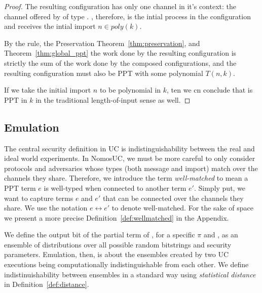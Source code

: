 \begin{proof}
The resulting configuration  has only one channel in it's context: the channel offered by  of type . 
, therefore, is the intial process in the configuration and receives the intial import $n \in poly(k)$.

By the  rule, the Preservation Theorem~\ref{thm:preservation}, and Theorem~\ref{thm:global_ppt} the work done by the resulting configuration is strictly the sum of the work done by the composed configurations, and the resulting configuration  must also be PPT with some polynomial $T(n,k)$.

If we take the initial import $n$ to be polynomial in $k$, ten we cn conclude that  is PPT in $k$ in the traditional length-of-input sense as well.

\end{proof}


\subsection{Emulation}
The central security definition in UC is indistinguishability between the real and ideal world experiments.
In NomosUC, we must be more careful to only consider protocols and adversaries whose types (both message and import) match over the channels they share. 
Therefore, we introduce the term \textit{well-matched} to mean a PPT term $e$ is well-typed when connected to another term $e'$.
Simply put, we want to capture terms $e$ and $e'$ that can be connected over the channels they share.
We use the notation $e \leftrightarrow e'$ to denote well-matched. For the sake of space we present a more precise Definition~\ref{def:wellmatched} in the Appendix. 


We define the output bit of the partial term of , for a specific $\pi$ and \F, as an ensemble of distributions over all possible random bitstrings and security parameters.
Emulation, then, is about the ensembles created by two UC executions being computationally indistinguishable from each other.
We define indistinuishability between ensembles in a standard way using \textit{statistical distance} in Definition~\ref{def:distance}.

